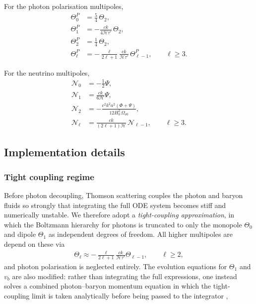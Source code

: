 \documentclass[twocolumn]{aa}
\begin{document}
For the photon polarisation multipoles,
\begin{align*}
\Theta_0^P &= \frac{5}{4}\,\Theta_2, \\
\Theta_1^P &= -\frac{ck}{4\mathcal{H}\tau'}\,\Theta_2, \\
\Theta_2^P &= \frac{1}{4}\,\Theta_2, \\
\Theta_\ell^P &= -\frac{\ell}{2\ell+1}\frac{ck}{\mathcal{H}\tau'}\,\Theta_{\ell-1}^P, \qquad \ell \geq 3.
\end{align*}

For the neutrino multipoles,
\begin{align*}
\mathcal{N}_0 &= -\frac{1}{2}\Psi, \\
\mathcal{N}_1 &= \frac{ck}{6\mathcal{H}}\Psi, \\
\mathcal{N}_2 &= -\frac{c^2k^2a^2(\Phi+\Psi)}{12H_0^2\,\Omega_{\nu 0}}, \\
\mathcal{N}_\ell &= \frac{ck}{(2\ell+1)\mathcal{H}}\,\mathcal{N}_{\ell-1}, \qquad \ell \geq 3.
\end{align*}

\subsection{Implementation details}
\subsubsection{Tight coupling regime}

Before photon decoupling, Thomson scattering couples the photon and baryon fluids so strongly that integrating the full ODE system becomes stiff and numerically unstable. We therefore adopt a \emph{tight-coupling approximation}, in which the Boltzmann hierarchy for photons is truncated to only the monopole $\Theta_0$ and dipole $\Theta_1$ as independent degrees of freedom. All higher multipoles are depend on these via
\begin{align*}
    \Theta_\ell \approx -\frac{\ell}{2\ell+1}\frac{ck}{\mathcal{H}\tau'}\Theta_{\ell-1}, \qquad \ell \geq 2,
\end{align*}
and photon polarisation is neglected entirely. The evolution equations for $\Theta_1$ and $v_b$ are also modified: rather than integrating the full expressions, one instead solves a combined photon--baryon momentum equation in which the tight-coupling limit is taken analytically before being passed to the integrator \citep{winther_milestone3},
\end{document}
